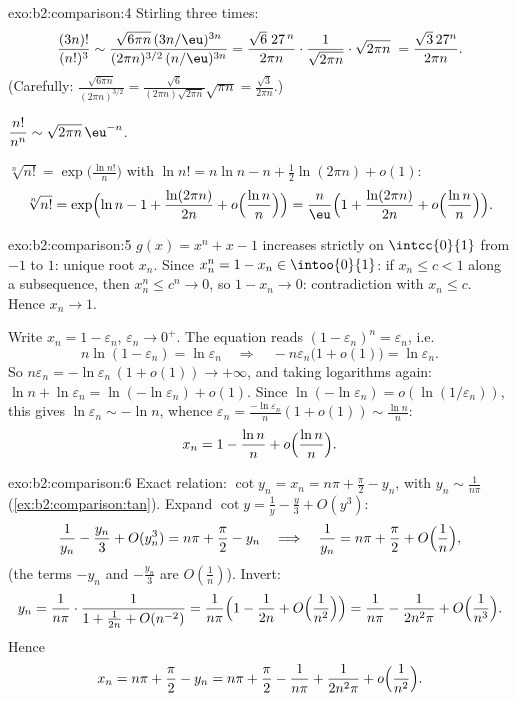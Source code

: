 \begin{solution}{exo:b2:comparison:4}
Stirling three times:
\[
\frac{(3n)!}{(n!)^3}
\sim \frac{\sqrt{6\pi n}\,(3n/\eu)^{3n}}
{(2\pi n)^{3/2}\,(n/\eu)^{3n}}
= \frac{\sqrt{6}\; 27^{\,n}}{2\pi n} \cdot
\frac{1}{\sqrt{2\pi n}}\cdot\sqrt{2\pi n}\;
= \frac{\sqrt3\,27^n}{2\pi n} .
\]
(Carefully: $\frac{\sqrt{6\pi n}}{(2\pi n)^{3/2}} =
\frac{\sqrt6}{(2\pi n)\sqrt{2\pi n}}\sqrt{\pi n} =
\frac{\sqrt3}{2\pi n}$.)

$\dfrac{n!}{n^n} \sim \sqrt{2\pi n}\,\eu^{-n}$.

$\sqrt[n]{n!} = \exp\bigl(\frac{\ln n!}{n}\bigr)$ with $\ln n! = n\ln
n - n + \frac12\ln(2\pi n) + o(1)$:
\[
\sqrt[n]{n!} = \exp\Bigl(\ln n - 1 + \frac{\ln(2\pi n)}{2n} +
o\Bigl(\frac{\ln n}{n}\Bigr)\Bigr)
= \frac{n}{\eu}\Bigl(1 + \frac{\ln(2\pi n)}{2n} +
o\Bigl(\frac{\ln n}{n}\Bigr)\Bigr).
\]
\end{solution}

\begin{solution}{exo:b2:comparison:5}
$g(x) = x^n + x - 1$ increases strictly on $\intcc{0}{1}$ from $-1$
to $1$: unique root $x_n$. Since $x_n^n = 1 - x_n \in
\intoo{0}{1}$: if $x_n \leq c < 1$ along a subsequence, then $x_n^n
\leq c^n \to 0$, so $1 - x_n \to 0$: contradiction with $x_n \leq
c$. Hence $x_n \to 1$.

Write $x_n = 1 - \varepsilon_n$, $\varepsilon_n \to 0^+$. The
equation reads $(1 - \varepsilon_n)^n = \varepsilon_n$, i.e.
\[
n\ln(1 - \varepsilon_n) = \ln \varepsilon_n
\quad\Longrightarrow\quad
-n\varepsilon_n\bigl(1 + o(1)\bigr) = \ln\varepsilon_n .
\]
So $n\varepsilon_n = -\ln\varepsilon_n\,(1 + o(1)) \to +\infty$, and
taking logarithms again: $\ln n + \ln\varepsilon_n =
\ln(-\ln\varepsilon_n) + o(1)$. Since $\ln(-\ln \varepsilon_n) =
o(\ln(1/\varepsilon_n))$, this gives $\ln\varepsilon_n \sim -\ln
n$, whence $\varepsilon_n = \frac{-\ln\varepsilon_n}{n}(1 + o(1))
\sim \frac{\ln n}{n}$:
\[
x_n = 1 - \frac{\ln n}{n} + o\Bigl(\frac{\ln n}{n}\Bigr) .
\]
\end{solution}

\begin{solution}{exo:b2:comparison:6}
Exact relation: $\cot y_n = x_n = n\pi + \frac\pi2 - y_n$, with $y_n
\sim \frac{1}{n\pi}$ (\cref{ex:b2:comparison:tan}). Expand $\cot y
= \frac1y - \frac y3 + O(y^3)$:
\[
\frac{1}{y_n} - \frac{y_n}{3} + O(y_n^3) = n\pi + \frac\pi2 - y_n
\quad\Longrightarrow\quad
\frac{1}{y_n} = n\pi + \frac\pi2 + O\Bigl(\frac1n\Bigr),
\]
(the terms $-y_n$ and $-\frac{y_n}{3}$ are $O(\frac1n)$). Invert:
\[
y_n = \frac{1}{n\pi}\cdot\frac{1}{1 + \frac{1}{2n} + O(n^{-2})}
= \frac{1}{n\pi}\Bigl(1 - \frac{1}{2n} + O\Bigl(\frac{1}{n^2}\Bigr)\Bigr)
= \frac{1}{n\pi} - \frac{1}{2n^2\pi} + O\Bigl(\frac{1}{n^3}\Bigr).
\]
Hence
\[
x_n = n\pi + \frac{\pi}{2} - y_n
= n\pi + \frac\pi2 - \frac{1}{n\pi} + \frac{1}{2n^2\pi} +
o\Bigl(\frac{1}{n^2}\Bigr).
\]
\end{solution}


